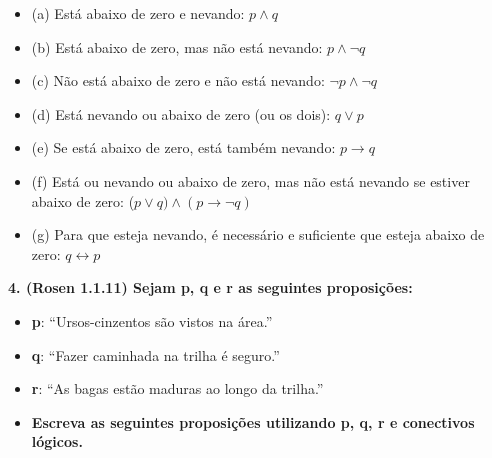 \documentclass{article}
\begin{document}
\begin{itemize}[label={}]
    \item(a) Está abaixo de zero e nevando: \> $p \wedge q$ \\
        
    \item(b) Está abaixo de zero, mas não está nevando: \> $p \wedge \neg q$
    
    \item(c) Não está abaixo de zero e não está nevando: \> $\neg p \wedge \neg q$
    
    \item(d) Está nevando ou abaixo de zero (ou os dois): \> $q \lor p$
    
    \item(e) Se está abaixo de zero, está também nevando: \> $p \rightarrow q$
    
    \item(f) Está ou nevando ou abaixo de zero, mas não está nevando se estiver abaixo de zero: \> ($p \vee  q) \wedge (p \rightarrow \neg q)$
    
    \item(g) Para que esteja nevando, é necessário e suficiente que esteja abaixo de zero: \> $q \leftrightarrow p$
    
\end{itemize}

\vspace{1cm}

\textbf{4. (Rosen 1.1.11) Sejam p, q e r as seguintes proposições:}

    \begin{itemize}[label={}]
        \item \textbf{p}: “Ursos-cinzentos são vistos na área.”
        \item \textbf{q}: “Fazer caminhada na trilha é seguro.”
        \item \textbf{r}: “As bagas estão maduras ao longo da trilha.” 
    \end{itemize}

    \begin{itemize}[label={}]
    \vspace{0.5mm}
        \item \textbf{Escreva as seguintes proposições utilizando p, q, r e conectivos lógicos.}
    \end{itemize}
\end{document}
